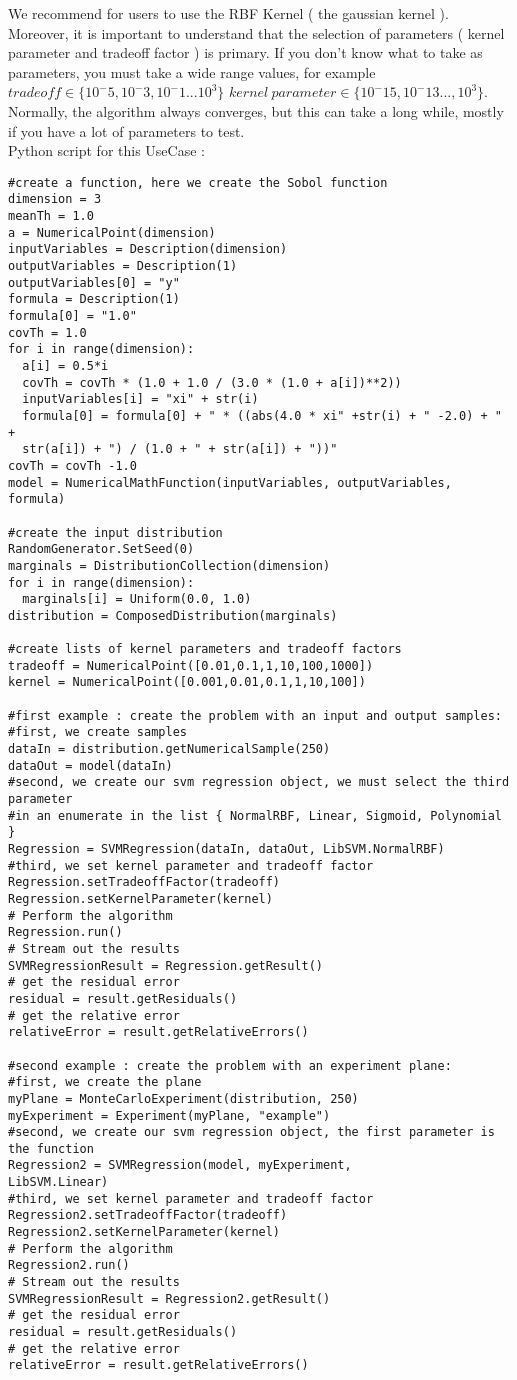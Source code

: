We recommend for users to use the RBF Kernel ( the gaussian kernel ). Moreover, it is important to understand that the selection of parameters ( kernel parameter and tradeoff factor ) is primary. If you don't know 
what to take as parameters, you must take a wide range values, for example $tradeoff \in \{10^-5,10^-3,10^-1...10^3 \}$ $kernel\ parameter \in \{10^-15, 10^-13...,10^3 \}$. Normally, the algorithm always converges, but this can take a long while, mostly if you have a lot of parameters to test.\\

Python script for this UseCase :
\begin{lstlisting}
#create a function, here we create the Sobol function
dimension = 3
meanTh = 1.0
a = NumericalPoint(dimension)
inputVariables = Description(dimension)
outputVariables = Description(1)
outputVariables[0] = "y"
formula = Description(1)
formula[0] = "1.0"
covTh = 1.0
for i in range(dimension):
  a[i] = 0.5*i
  covTh = covTh * (1.0 + 1.0 / (3.0 * (1.0 + a[i])**2))
  inputVariables[i] = "xi" + str(i)
  formula[0] = formula[0] + " * ((abs(4.0 * xi" +str(i) + " -2.0) + " + 
  str(a[i]) + ") / (1.0 + " + str(a[i]) + "))"
covTh = covTh -1.0
model = NumericalMathFunction(inputVariables, outputVariables, formula)

#create the input distribution
RandomGenerator.SetSeed(0)
marginals = DistributionCollection(dimension)
for i in range(dimension):
  marginals[i] = Uniform(0.0, 1.0)
distribution = ComposedDistribution(marginals)

#create lists of kernel parameters and tradeoff factors
tradeoff = NumericalPoint([0.01,0.1,1,10,100,1000])
kernel = NumericalPoint([0.001,0.01,0.1,1,10,100])

#first example : create the problem with an input and output samples:
#first, we create samples
dataIn = distribution.getNumericalSample(250)
dataOut = model(dataIn)
#second, we create our svm regression object, we must select the third parameter 
#in an enumerate in the list { NormalRBF, Linear, Sigmoid, Polynomial }
Regression = SVMRegression(dataIn, dataOut, LibSVM.NormalRBF)
#third, we set kernel parameter and tradeoff factor
Regression.setTradeoffFactor(tradeoff)
Regression.setKernelParameter(kernel)
# Perform the algorithm
Regression.run()
# Stream out the results
SVMRegressionResult = Regression.getResult()
# get the residual error
residual = result.getResiduals()
# get the relative error
relativeError = result.getRelativeErrors()

#second example : create the problem with an experiment plane:
#first, we create the plane
myPlane = MonteCarloExperiment(distribution, 250)
myExperiment = Experiment(myPlane, "example")
#second, we create our svm regression object, the first parameter is the function
Regression2 = SVMRegression(model, myExperiment, 
LibSVM.Linear)
#third, we set kernel parameter and tradeoff factor
Regression2.setTradeoffFactor(tradeoff)
Regression2.setKernelParameter(kernel)
# Perform the algorithm
Regression2.run()
# Stream out the results
SVMRegressionResult = Regression2.getResult()
# get the residual error
residual = result.getResiduals()
# get the relative error
relativeError = result.getRelativeErrors()


\end{lstlisting}

